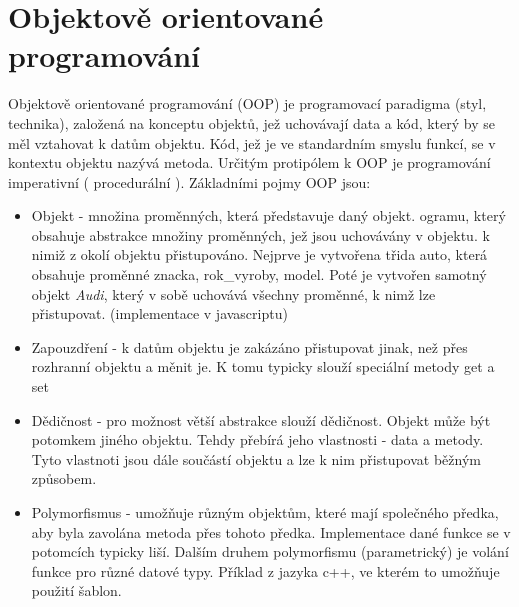 \documentclass[main.tex]{subfiles}
\begin{document}
\section{Objektově orientované programování}
Objektově orientované programování (OOP) je programovací paradigma (styl, technika), založená na konceptu objektů, jež uchovávají data a kód, který by se měl vztahovat k datům objektu. Kód, jež je ve standardním smyslu funkcí, se v kontextu objektu nazývá metoda. Určitým protipólem k OOP je programování imperativní ( procedurální ). Základními pojmy OOP jsou:
\begin{itemize}
	\item Objekt - množina proměnných, která představuje daný objekt. ogramu, který obsahuje abstrakce množiny proměnných, jež jsou uchovávány v objektu. k nimiž z okolí objektu přistupováno.
		Nejprve je vytvořena třida auto, která obsahuje proměnné znacka, rok\_vyroby, model. Poté je vytvořen samotný objekt \textit{Audi}, který v sobě uchovává všechny proměnné, k nimž lze přistupovat. (implementace v javascriptu)
	\item Zapouzdření - k datům objektu je zakázáno přistupovat jinak, než přes rozhranní objektu a měnit je. K tomu typicky slouží speciální metody get a set
	\item Dědičnost - pro možnost větší abstrakce slouží dědičnost. Objekt může být potomkem jiného objektu. Tehdy přebírá jeho vlastnosti - data a metody. Tyto vlastnoti jsou dále součástí objektu a lze k nim přistupovat běžným způsobem.
	\item Polymorfismus - umožňuje různým objektům, které mají společného předka, aby byla zavolána metoda přes tohoto předka. Implementace dané funkce se v potomcích typicky liší.
		Dalším druhem polymorfismu (parametrický) je volání funkce pro různé datové typy. Příklad z jazyka c++, ve kterém to umožňuje použití šablon.
\end{itemize}
\end{document}

